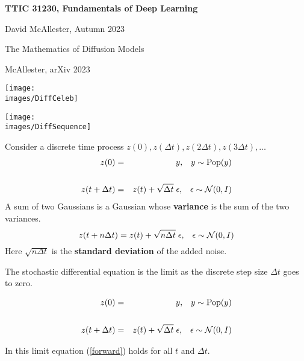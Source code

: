 





{\Huge

  \centerline{\bf TTIC 31230, Fundamentals of Deep Learning}
  \bigskip
  \centerline{David McAllester, Autumn 2023}
  \vfill
  \vfil
  \centerline{The Mathematics of Diffusion Models}
  \vfill
  \centerline{McAllester, arXiv 2023}
    \vfill
  \vfill


\centerline{\texttt{[image: \\images/DiffCeleb]}}

\centerline{\texttt{[image: \\images/DiffSequence]}}

Consider a discrete time process $z(0),z(\Delta t),z(2\Delta t),z(3\Delta t),\ldots$
{\huge
\begin{eqnarray*}
  z(0) & = & y,\;\;\;y \sim \mathrm{Pop}(y) \\
  \\
  z(t+\Delta t) & = & z(t) + \sqrt{\Delta t}\; \epsilon,\;\;\;\epsilon \sim {\cal N}(0,I)
\end{eqnarray*}
}
A sum of two Gaussians is a Gaussian whose {\bf variance} is the sum of the two variances.
$$z(t+n\Delta t) = z(t) + \sqrt{n\Delta t}\; \epsilon,\;\;\;\epsilon \sim {\cal N}(0,I)$$
Here $\sqrt{n \Delta t}$ is the {\bf standard deviation} of the added noise.


The stochastic differential equation is the limit as the discrete step size $\Delta t$ goes to zero.

{\huge
\begin{eqnarray}
  z(0) & = & y,\;\;\;y \sim \mathrm{Pop}(y) \nonumber \\
  \nonumber \\
  z(t+\Delta t) & = & z(t) + \sqrt{\Delta t}\; \epsilon,\;\;\;\epsilon \sim {\cal N}(0,I) \label{forward}
\end{eqnarray}
}

In this limit equation (\ref{forward}) holds for all $t$ and $\Delta t$.


}
